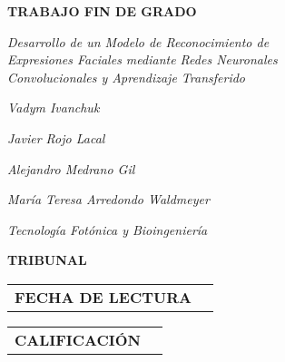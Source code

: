 \begin{titlepage}
\begin{large}
    \textbf{TRABAJO FIN DE GRADO}
        \signature{\break}{}
        \signature{Título}{\textit{Desarrollo de un Modelo de Reconocimiento de \\ Expresiones Faciales mediante Redes Neuronales \\ Convolucionales y Aprendizaje Transferido}}
        \signature{Autor}{\textit{Vadym Ivanchuk}}
        \signature{Tutor}{\textit{Javier Rojo Lacal}}
        \signature{Cotutor}{\textit{Alejandro Medrano Gil}}
        \signature{Ponente}{\textit{María Teresa Arredondo Waldmeyer}}
        \signature{Departamento}{\textit{Tecnología Fotónica y Bioingeniería}}
        \signature{\break}{}
    \textbf{TRIBUNAL}
        \signature{\break}{}
        \signature{Presidente}{\textit{}}
        \signature{Vocal}{\textit{}}
        \signature{Secretario}{\textit{}}
        \signature{Suplente}{\textit{}}
        \signature{\break}{}
    \hspace*{-1.5cm}\begin{tabular}{c | c}
        \textbf{FECHA DE LECTURA} & \\
    \end{tabular} 
    \newline \break
    \hspace*{-3.62cm}\begin{tabular}{c | c} 
        \textbf{CALIFICACIÓN} & \\
    \end{tabular}

\end{large}
\end{titlepage}

